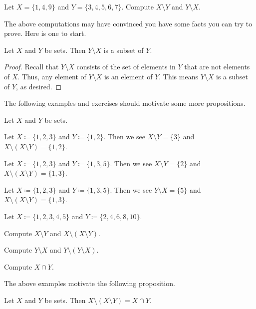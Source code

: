 \documentclass[../notes.tex]{subfiles}
\begin{document}
\begin{exercise}
    Let $X=\{1,4,9\}$ and $Y=\{3,4,5,6,7\}$. Compute $X\setminus Y$ and $Y\setminus X$.
\end{exercise}
The above computations may have convinced you have some facts you can try to prove. Here is one to start.
\begin{proposition}
    Let $X$ and $Y$ be sets. Then $Y\setminus X$ is a subset of $Y$.
\end{proposition}
\begin{proof}
    Recall that $Y\setminus X$ consists of the set of elements in $Y$ that are not elements of $X$. Thus, any element of $Y\setminus X$ is an element of $Y$. This means $Y\setminus X$ is a subset of $Y$, as desired.
\end{proof}
The following examples and exercises should motivate some more propositions.
\begin{example}
    Let $X$ and $Y$ be sets.
    \begin{listalph}
        \item Let $X\coloneqq\{1,2,3\}$ and $Y\coloneqq\{1,2\}$. Then we see $X\setminus Y=\{3\}$ and $X\setminus(X\setminus Y)=\{1,2\}$.
        \item Let $X\coloneqq\{1,2,3\}$ and $Y\coloneqq\{1,3,5\}$. Then we see $X\setminus Y=\{2\}$ and $X\setminus(X\setminus Y)=\{1,3\}$.
        \item Let $X\coloneqq\{1,2,3\}$ and $Y\coloneqq\{1,3,5\}$. Then we see $Y\setminus X=\{5\}$ and $X\setminus(X\setminus Y)=\{1,3\}$.
    \end{listalph}
\end{example}
\begin{exercise}
    Let $X\coloneqq\{1,2,3,4,5\}$ and $Y\coloneqq\{2,4,6,8,10\}$.
    \begin{listalph}
        \item Compute $X\setminus Y$ and $X\setminus(X\setminus Y)$.
        \item Compute $Y\setminus X$ and $Y\setminus(Y\setminus X)$.
        \item Compute $X\cap Y$.
    \end{listalph}
\end{exercise}
The above examples motivate the following proposition.
\begin{proposition} \label{prop:double-comp}
    Let $X$ and $Y$ be sets. Then $X\setminus(X\setminus Y)=X\cap Y$.
\end{proposition}
\end{document}
